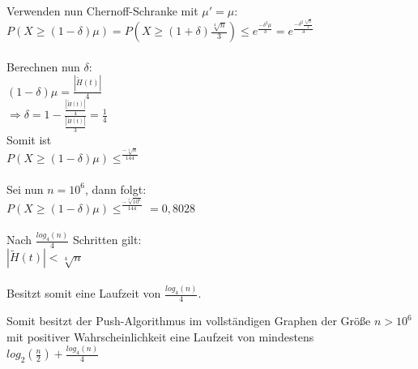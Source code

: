 \documentclass[12pt,a4paper]{report}
\begin{document}
\begin{itemize}
	Verwenden nun Chernoff-Schranke mit $\mu' = \mu$:\\
	$P(X\ge(1-\delta)\mu)=P(X\ge(1+\delta)\frac{\sqrt[4]{n}}{3})\le e^{\frac{-\delta^2 \mu}{3}}=e^{\frac{-\delta^2 \frac{\sqrt[4]{n}}{3}}{3}}$\\
	\\
	Berechnen nun $\delta$:\\
	$(1-\delta)\mu = \frac{|\tilde{H}(t)|}{4}$\\
	$\Rightarrow \delta =1-\frac{\frac{|\tilde{H}(t)|}{4}}{\frac{|\tilde{H}(t)|}{3}} = \frac{1}{4}$\\
	Somit ist\\
	$P(X\ge(1-\delta)\mu)\le^{\frac{-\sqrt[4]{n}}{144}}$\\
	\\
	Sei nun $n=10^6$, dann folgt:\\
	$P(X\ge(1-\delta)\mu)\le^{\frac{-\sqrt[4]{10^6}}{144}} = 0,8028$\\
	\\
	Nach $\frac{log_4(n)}{4}$ Schritten gilt:\\
	$|\tilde{H}(t)| < \sqrt[4]{n}$\\
	\\
	Besitzt somit eine Laufzeit von $\frac{log_4(n)}{4}$.
\end{itemize}
Somit besitzt der Push-Algorithmus im vollständigen Graphen der Größe $n>10^6$ mit positiver Wahrscheinlichkeit eine Laufzeit von mindestens\\ $log_2(\frac{n}{2})+\frac{log_4(n)}{4}$
\end{document}
